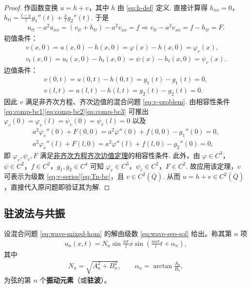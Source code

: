 \documentclass[../../main.tex]{subfiles}%
\begin{document}
\begin{proof}
作函数变换 $u=h+v$，其中 $h$ 由 \eqref{eq:h-def} 定义. 直接计算得 $h_{xx}=0$，$h_{tt}=\frac{l-x}{l}g_1''(t)+\frac{x}{l}g_2''(t)$. 于是
\begin{align*}
u_{tt}-a^2u_{xx}=(v_{tt}+h_{tt})-a^2v_{xx}=f
\Longrightarrow v_{tt}-a^2v_{xx}=f-h_{tt}=F.
\end{align*}
初值条件：
\begin{align*}
v(x,0)=u(x,0)-h(x,0)=\varphi(x)-h(x,0)=\varphi_v(x),\\
v_t(x,0)=u_t(x,0)-h_t(x,0)=\psi(x)-h_t(x,0)=\psi_v(x).
\end{align*}
边值条件：
\begin{align*}
v(0,t)=u(0,t)-h(0,t)=g_1(t)-g_1(t)=0,\\
v(l,t)=u(l,t)-h(l,t)=g_2(t)-g_2(t)=0.
\end{align*}
因此 $v$ 满足非齐次方程、齐次边值的混合问题 \eqref{eq:v-problem}. 由相容性条件 \eqref{eq:comp-bc1}\eqref{eq:comp-bc2}\eqref{eq:comp-bc3} 可推出 $\varphi_v(0)=\varphi_v(l)=\psi_v(0)=\psi_v(l)=0$ 以及
\begin{align*}
a^2\varphi_v''(0)+F(0,0)=a^2\varphi''(0)+f(0,0)-g_1''(0)=0,\\
a^2\varphi_v''(l)+F(l,0)=a^2\varphi''(l)+f(l,0)-g_2''(0)=0,
\end{align*}
即 $\varphi_v,\psi_v,F$ 满足\hyperref[theorem:一维波动方程的混合问题非齐次方程、齐次边值情形的解]{非齐次方程齐次边值定理}的相容性条件. 此外，由 $\varphi\in C^3$，$\psi\in C^2$，$f\in C^2$，$g_1,g_2\in C^4$ 可知 $\varphi_v\in C^3$，$\psi_v\in C^2$，$F\in C^2$. 故应用该定理，$v$ 可表示为级数 \eqref{eq:v-series}\eqref{eq:Tn-bc}，且 $v\in C^2(\overline{Q})$. 从而 $u=h+v\in C^2(\overline{Q})$，直接代入原问题即验证其为解.
\end{proof}



\subsection{驻波法与共振}

\begin{definition}
设混合问题 \eqref{eq:wave-mixed-hom} 的解由级数 \eqref{eq:wave-sep-sol} 给出。称其第 $n$ 项
\begin{align}
u_n(x,t)=N_n\sin\frac{n\pi}{l}x\sin\left(\frac{na\pi}{l}t+\alpha_n\right), \label{eq:standing-wave}
\end{align}
其中
\begin{align*}
N_n=\sqrt{A_n^2+B_n^2},\qquad \alpha_n=\arctan\frac{A_n}{B_n},
\end{align*}
为弦的第 $n$ 个\textbf{振动元素}（或\textbf{驻波}）。
\end{definition}
\end{document}
